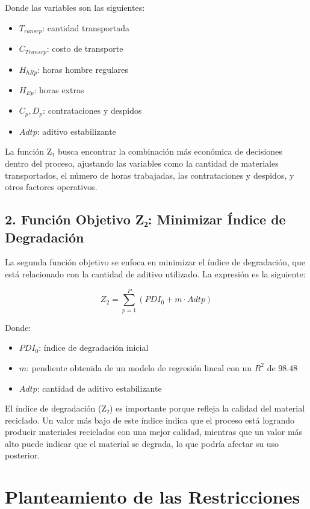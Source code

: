\documentclass[a4paper,12pt]{article}
\begin{document}
Donde las variables son las siguientes:
\begin{itemize}
    \item \( T_{r a n s r p} \): cantidad transportada
    \item \( C_{T r a n s r p} \): costo de transporte
    \item \( H_{h R p} \): horas hombre regulares
    \item \( H_{E p} \): horas extras
    \item \( C_p, D_p \): contrataciones y despidos
    \item \( A d t p \): aditivo estabilizante
\end{itemize}
La función Z₁ busca encontrar la combinación más económica de decisiones dentro del proceso, ajustando las variables como la cantidad de materiales transportados, el número de horas trabajadas, las contrataciones y despidos, y otros factores operativos.

\subsection*{2. Función Objetivo Z₂: 
Minimizar Índice de Degradación}
La segunda función objetivo se enfoca en minimizar el índice de degradación, que está relacionado con la cantidad de aditivo utilizado. La expresión es la siguiente:

\[
Z_2 = \sum_{p=1}^{P} \left( P D I_0 + m \cdot A d t p \right)
\]

Donde:
\begin{itemize}
    \item \( P D I_0 \): índice de degradación inicial
    \item \( m \): pendiente obtenida de un modelo de regresión lineal con un \( R^2 \) de 98.48%
    \item \( A d t p \): cantidad de aditivo estabilizante
\end{itemize}
El índice de degradación (Z₂) es importante porque refleja la calidad del material reciclado. Un valor más bajo de este índice indica que el proceso está logrando producir materiales reciclados con una mejor calidad, mientras que un valor más alto puede indicar que el material se degrada, lo que podría afectar su uso posterior.

\newpage

\section*{Planteamiento de las Restricciones}
\end{document}
